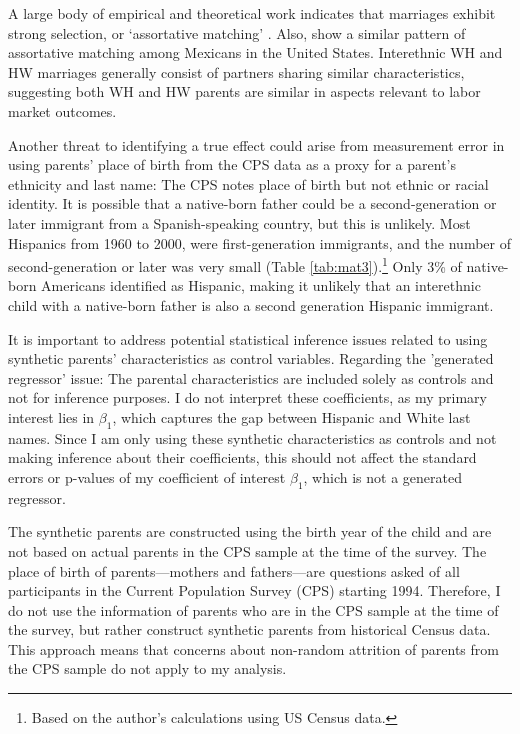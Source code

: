A large body of empirical and theoretical work indicates that marriages exhibit strong selection, or `assortative matching' \autocite{averettBetterWorseRelationship2008, averettEconomicRealityBeauty1996, beckerTheoryMarriagePart1973, beckerTheoryMarriagePart1974, beckerTreatiseFamily1993, browningCollectiveUnitaryModels2006, chiapporiFatterAttractionAnthropometric2012}. Also, \textcite{duncanIntermarriageIntergenerationalTransmission2011} show a similar pattern of assortative matching among Mexicans in the United States. Interethnic WH and HW marriages generally consist of partners sharing similar characteristics, suggesting both WH and HW parents are similar in aspects relevant to labor market outcomes.

Another threat to identifying a true effect could arise from measurement error in using parents’ place of birth from the CPS data as a proxy for a parent’s ethnicity and last name: The CPS notes place of birth but not ethnic or racial identity. It is possible that a native-born father could be a second-generation or later immigrant from a Spanish-speaking country, but this is unlikely. Most Hispanics from 1960 to 2000,  were first-generation immigrants, and the number of second-generation or later was very small (Table \ref{tab:mat3}).\footnote{Based on the author's calculations using US Census data.} Only 3\% of native-born Americans identified as Hispanic, making it unlikely that an interethnic child with a native-born father is also a second generation Hispanic immigrant. 

It is important to address potential statistical inference issues related to using synthetic parents' characteristics as control variables. Regarding the 'generated regressor' issue: The parental characteristics are included solely as controls and not for inference purposes. I do not interpret these coefficients, as my primary interest lies in $\beta_1$, which captures the gap between Hispanic and White last names. Since I am only using these synthetic characteristics as controls and not making inference about their coefficients, this should not affect the standard errors or p-values of my coefficient of interest $\beta_1$, which is not a generated regressor.

The synthetic parents are constructed using the birth year of the child and are not based on actual parents in the CPS sample at the time of the survey. The place of birth of parents—mothers and fathers—are questions asked of all participants in the Current Population Survey (CPS) starting 1994. Therefore, I do not use the information of parents who are in the CPS sample at the time of the survey, but rather construct synthetic parents from historical Census data. This approach means that concerns about non-random attrition of parents from the CPS sample do not apply to my analysis.

